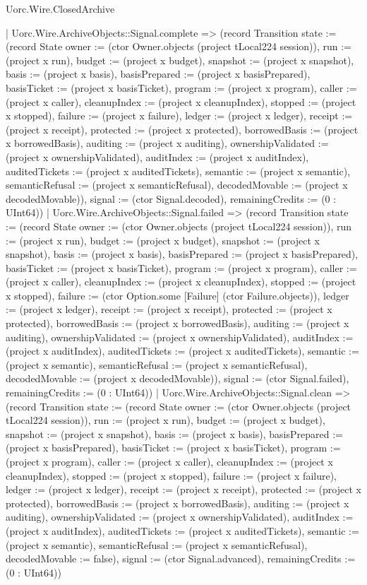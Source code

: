 \begin{lexlean}{Uorc.Wire.ClosedArchive}
\begin{semanticmodule}
{      | Uorc.Wire.ArchiveObjects::Signal.complete => (record Transition {state := (record State {owner := (ctor Owner.objects (project tLocal224 session)), run := (project x run), budget := (project x budget), snapshot := (project x snapshot), basis := (project x basis), basisPrepared := (project x basisPrepared), basisTicket := (project x basisTicket), program := (project x program), caller := (project x caller), cleanupIndex := (project x cleanupIndex), stopped := (project x stopped), failure := (project x failure), ledger := (project x ledger), receipt := (project x receipt), protected := (project x protected), borrowedBasis := (project x borrowedBasis), auditing := (project x auditing), ownershipValidated := (project x ownershipValidated), auditIndex := (project x auditIndex), auditedTickets := (project x auditedTickets), semantic := (project x semantic), semanticRefusal := (project x semanticRefusal), decodedMovable := (project x decodedMovable)}), signal := (ctor Signal.decoded), remainingCredits := (0 : UInt64)})
      | Uorc.Wire.ArchiveObjects::Signal.failed => (record Transition {state := (record State {owner := (ctor Owner.objects (project tLocal224 session)), run := (project x run), budget := (project x budget), snapshot := (project x snapshot), basis := (project x basis), basisPrepared := (project x basisPrepared), basisTicket := (project x basisTicket), program := (project x program), caller := (project x caller), cleanupIndex := (project x cleanupIndex), stopped := (project x stopped), failure := (ctor Option.some [Failure] (ctor Failure.objects)), ledger := (project x ledger), receipt := (project x receipt), protected := (project x protected), borrowedBasis := (project x borrowedBasis), auditing := (project x auditing), ownershipValidated := (project x ownershipValidated), auditIndex := (project x auditIndex), auditedTickets := (project x auditedTickets), semantic := (project x semantic), semanticRefusal := (project x semanticRefusal), decodedMovable := (project x decodedMovable)}), signal := (ctor Signal.failed), remainingCredits := (0 : UInt64)})
      | Uorc.Wire.ArchiveObjects::Signal.clean => (record Transition {state := (record State {owner := (ctor Owner.objects (project tLocal224 session)), run := (project x run), budget := (project x budget), snapshot := (project x snapshot), basis := (project x basis), basisPrepared := (project x basisPrepared), basisTicket := (project x basisTicket), program := (project x program), caller := (project x caller), cleanupIndex := (project x cleanupIndex), stopped := (project x stopped), failure := (project x failure), ledger := (project x ledger), receipt := (project x receipt), protected := (project x protected), borrowedBasis := (project x borrowedBasis), auditing := (project x auditing), ownershipValidated := (project x ownershipValidated), auditIndex := (project x auditIndex), auditedTickets := (project x auditedTickets), semantic := (project x semantic), semanticRefusal := (project x semanticRefusal), decodedMovable := false}), signal := (ctor Signal.advanced), remainingCredits := (0 : UInt64)})
}
\end{semanticmodule}
\end{lexlean}
